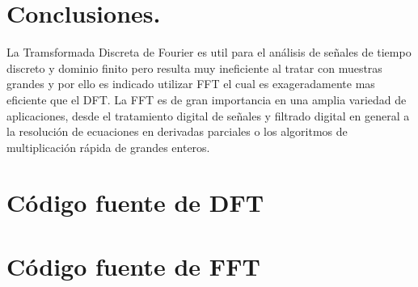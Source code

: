 \documentclass[12pt,letterpaper]{article}
\begin{document}
\section{Conclusiones.}
La Tramsformada Discreta de Fourier es util para el an\'alisis de señales de tiempo discreto y dominio finito pero resulta muy ineficiente al tratar con muestras grandes y por ello es indicado utilizar FFT el cual es exageradamente mas eficiente que el DFT.
La FFT es de gran importancia en una amplia variedad de aplicaciones, desde el tratamiento digital de señales y filtrado digital en general a la resoluci\'on de ecuaciones en derivadas parciales o los algoritmos de multiplicaci\'on r\'apida de grandes enteros.


\section{C\'odigo fuente de DFT} 
\label{code:DFT_1d}

\section{C\'odigo fuente de FFT} 
\label{code:FFT_1d}

\end{document}
